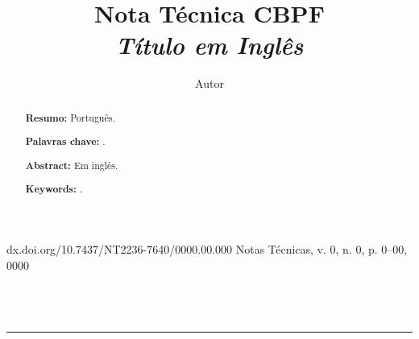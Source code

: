 

\usepackage{graphicx,url}       	  	%
\usepackage[brazil]{babel}          	%
\usepackage[utf8]{inputenc}   			%
\usepackage{setspace}       					%
\usepackage{indentfirst}   	 					%
\usepackage{enumerate}      					%
\usepackage{tikz}                   	%
\usepackage{color}
\fancyhead[RO,LE]{\thepage}
  \renewcommand{\headrulewidth}{0pt}
\usepackage{amsmath}
\hyphenation{}

\usepackage{graphicx}
\usepackage[colorinlistoftodos]{todonotes}



\linespread{1.5}

\noindent
{\footnotesize dx.doi.org/10.7437/NT2236-7640/0000.00.000} \newline
{\footnotesize Notas T\'ecnicas, v. 0, n. 0, p. 0--00, 0000}
\\
\newline
\\
\\
\\\hspace*{-9cm}\rule{50em}{0.2ex}

\title{Nota Técnica CBPF\\
{\footnotesize \it Título em Inglês}}

\author{Autor}

\begin{abstract}
\noindent
{\bf Resumo:} Português.

\vspace*{3mm}
\noindent
{\bf Palavras chave:} .

\vspace*{3mm}
\noindent
{\bf Abstract:} Em inglês.

\vspace*{3mm}
\noindent
{\bf Keywords:} .
\end{abstract}

